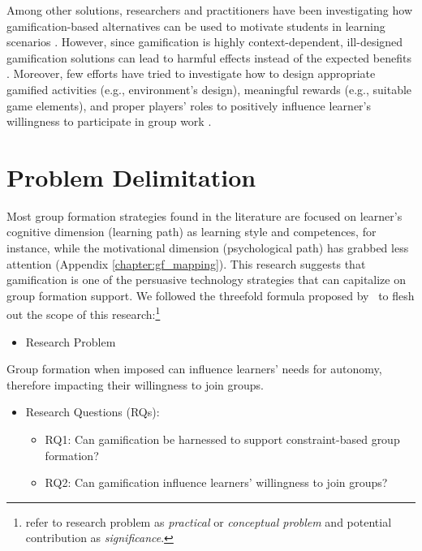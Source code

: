 Among other solutions, researchers and practitioners have been investigating how gamification-based alternatives can be used to motivate students in learning scenarios \cite{kapp2012gamification,A_systematic_mapping,Does_Gamification_Work}.
However, since gamification is highly context-dependent, ill-designed gamification solutions can lead to harmful effects instead of the expected benefits \cite{Demographic_differences_in_perceived_benefits,The_Bright_and_Dark_Sides_of_Gamification}. 
Moreover, few efforts have tried to investigate how to design appropriate gamified activities (e.g., environment’s design), meaningful rewards (e.g., suitable game elements), and proper players’ roles to positively influence learner's willingness to participate in group work \cite{A_Link_Between_Worlds}. 

\section{Problem Delimitation}
Most group formation strategies found in the literature are focused on learner's cognitive dimension (learning path) as learning style and competences, for instance, while the motivational dimension (psychological path) has grabbed less attention (Appendix \ref{chapter:gf_mapping}). 
This research suggests that gamification is one of the persuasive technology strategies that can capitalize on group formation support. We followed the threefold formula proposed by~\cite{the_craft_of_research} to flesh out the scope of this research:\footnote{
 refer to research problem as \emph{practical} or \emph{conceptual problem} and potential contribution as \emph{significance}.
}
\begin{itemize}
\item Research Problem
\end{itemize}
Group formation when imposed can influence learners' needs for autonomy, therefore impacting their willingness to join groups.

\begin{itemize}
\item Research Questions (RQs):
	\begin{itemize}
	\item RQ1: Can gamification be harnessed to support constraint-based group formation?
    \item RQ2: Can gamification influence learners' willingness to join groups?
	\end{itemize}
\end{itemize}

